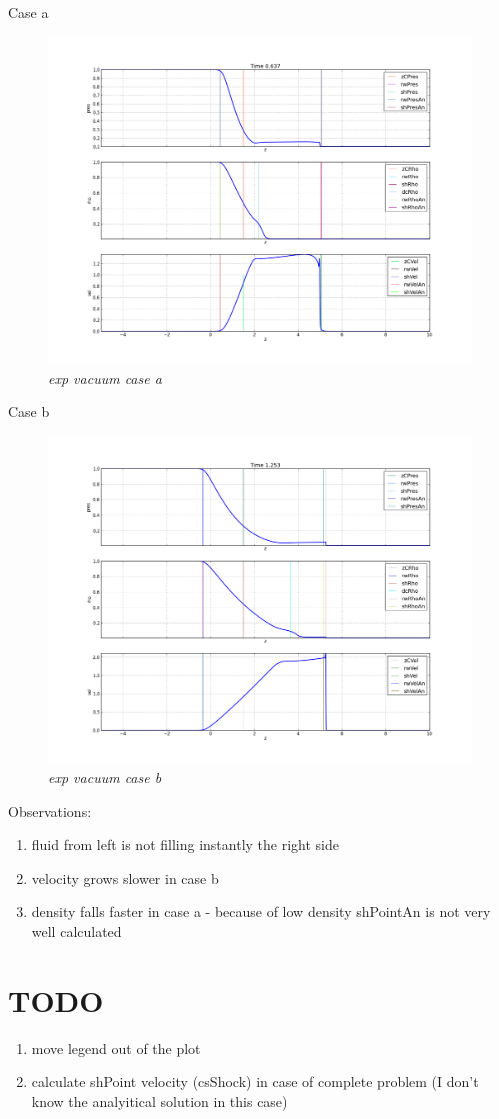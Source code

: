\documentclass[12pt]{book}
\begin{document}
Case a
\begin{figure}[!h]
 \centering
 \includegraphics[scale=0.4]{exp_vacuum_a.png}
	\caption{\emph{exp vacuum case a}}
 \label{Fig: 1}
\end{figure}


Case b

\begin{figure}[!h]
 \centering
 \includegraphics[scale=0.4]{exp_vacuum_b.png}
	\caption{\emph{exp vacuum case b}}
\end{figure}

Observations:
\begin{enumerate}
\item fluid from left is not filling instantly the right side
\item velocity grows slower in case b
\item density falls faster in case a 	- because of low density shPointAn is not very well calculated
\end{enumerate}

\section*{TODO}

\begin{enumerate}
\item move legend out of the plot
\item calculate shPoint velocity (csShock) in case of complete problem (I don't know the analyitical solution in this case)	
\end{enumerate}
\end{document}
